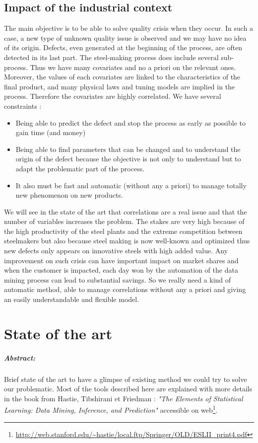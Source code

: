 \documentclass[12pt,a4paper]{report}
\begin{document}
	\section{Impact of the industrial context}
	 The main objective is to be able to solve quality crisis when they occur. In such a case, a new type of unknown quality issue is observed and we may have no idea of its origin. Defects, even generated at the beginning of the process, are often detected in its last part. The steel-making process does include several sub-process. Thus we have many covariates and no a priori on the relevant ones. Moreover, the values of each covariates are linked to the characteristics of the final product, and many physical laws and tuning models are implied in the process. Therefore the covariates are highly correlated.
	We have several constraints :
	\begin{itemize}
		\item Being able to predict the defect and stop the process as early as possible to gain time (and money)
		\item Being able to find parameters that can be changed and to understand the origin of the defect because the objective is not only to understand but to adapt the problematic part of the process.
		\item It also must be fast and automatic (without any a priori) to manage totally new phenomenon on new products.
	\end{itemize}
	We will see in the state of the art that correlations are a real issue and that the number of variables increases the problem.	
	The stakes are very high because of the high productivity of the steel plants and the extreme competition between steelmakers but also because steel making is now well-known and optimized thus new defects only appears on innovative steels with high added value. Any improvement on such crisis can have important impact on market shares and when the customer is impacted, each day won by the automation of the data mining process can lead to substantial savings. So we really need a kind of automatic method, able to manage correlations without any a priori and giving an easily understandable and flexible model.
	
\chapter{State of the art}
\paragraph{Abstract:} Brief state of the art to have a glimpse of existing method we could try to solve our problematic.
Most of the tools described here are explained with more details in the book from  Hastie, Tibshirani et Friedman : {\it "The Elements of Statistical Learning: Data Mining, Inference, and Prediction" } accessible on web\footnote{ \url{http://web.stanford.edu/~hastie/local.ftp/Springer/OLD/ESLII_print4.pdf}}.
\end{document}
